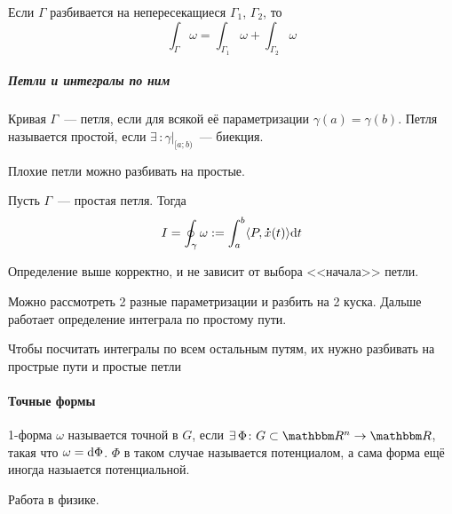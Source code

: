 \documentclass[12pt,timbord]{../../../notes}
\begin{document}
\begin{rem}
  Если $\Gamma$ разбивается на непересекащиеся $\Gamma_1$, $\Gamma_2$, то 
  \[
    \int_\Gamma \omega = \int_{\Gamma_1} \omega + \int_{\Gamma_2} \omega
  \]
\end{rem}

\subparagraph{Петли и интегралы по ним}


\begin{defn}\label{defn:lineint::defs::loop}
  Кривая $\Gamma$~--- петля, если для всякой её параметризации $\gamma(a) = \gamma(b)$. 
  Петля называется простой, если $\exists\, \colon \gamma\vert_{[a;b)}$~--- биекция.
\end{defn}
\begin{rem*}
  Плохие петли можно разбивать на простые.
\end{rem*}

\begin{defn}\label{defn:lineint::defs::loopint}
  Пусть $\Gamma$~--- простая петля. Тогда 
  \[
    I = \oint_\gamma \omega := \int_a^b \langle P,\accentset{\mbox{\bfseries .}}{x}(t)\rangle \mathrm{d} t
  \]
\end{defn}
\begin{prop}\label{prop:lineint::defs::loopint}
  Определение выше корректно, и не зависит от выбора <<начала>> петли. 
\end{prop}  
\begin{itlproof}
  Можно рассмотреть 2 разные параметризации и разбить на 2 куска. Дальше работает определение
  интеграла по простому пути.
\end{itlproof}

\begin{rem*}
  Чтобы посчитать интегралы по всем остальным путям, их нужно разбивать на прострые пути и
  простые петли
\end{rem*}


\paragraph{Точные формы}
\label{par:lineint::precforms}

\begin{defn}\label{defn:lineint::precforms::def}
  1-форма $\omega$ называется точной в $G$, если $\exists\, \Phi\colon G\subset \R^n\to \R$, такая что
  $\omega =  \mathrm{d} \Phi$. $\Phi$ в таком случае называется потенциалом, а сама форма ещё иногда
  назыается потенциальной.
\end{defn}
\begin{exmp*}
  Работа в физике.
\end{exmp*}
\end{document}
